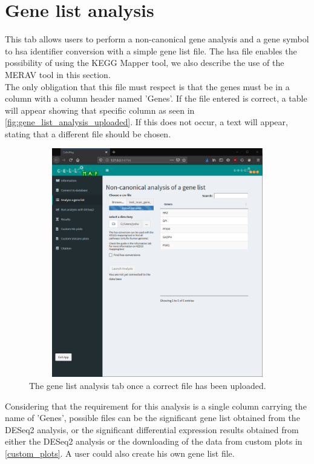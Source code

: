 \documentclass[11pt]{article}
\begin{document}
\section{Gene list analysis \label{gene_list_analysis}}
This tab allows users to perform a non-canonical gene analysis and a gene symbol to hsa identifier conversion with a simple gene list file. The hsa file enables the possibility of using the KEGG Mapper tool, we also describe the use of the MERAV tool in this section.\\
The only obligation that this file must respect is that the genes must be in a column with a column header named 'Genes'. If the file entered is correct, a table will appear showing that specific column as seen in \autoref{fig:gene_list_analysis_uploaded}. If this does not occur, a text will appear, stating that a different file should be chosen.
\begin{figure}[h!]
\centering
\includegraphics[width=15cm,height=10cm,keepaspectratio]{gene_list_analysis.png}
\caption{The gene list analysis tab once a correct file has been uploaded.}
\label{fig:gene_list_analysis_uploaded}
\end{figure}

Considering that the requirement for this analysis is a single column carrying the name of 'Genes', possible files can be the significant gene list obtained from the DESeq2 analysis, or the significant differential expression results obtained from either the DESeq2 analysis or the downloading of the data from custom plots in \autoref{custom_plots}. A user could also create his own gene list file.
\end{document}
